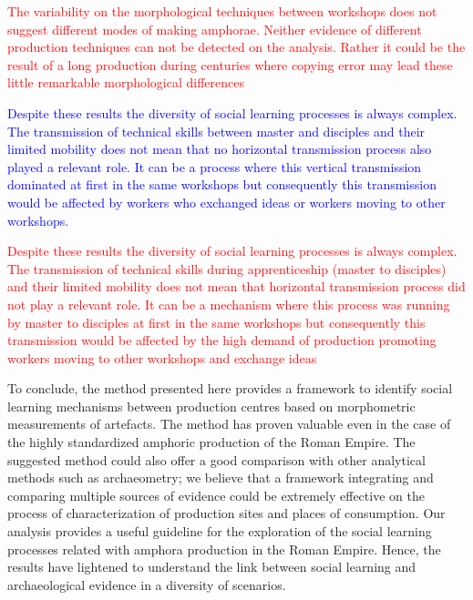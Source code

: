 \documentclass[review]{elsarticle}
\newcommand{\memo}[2]{\textcolor{#1}{#2}}
\newcommand{\maria}[1]{\memo{red}{#1\\}}
\newcommand{\revise}[1]{\memo{blue}{#1\\}}
\begin{document}
\maria{The variability on the morphological techniques between workshops does not suggest different modes of making amphorae. Neither evidence of different production techniques can not be detected on the analysis. Rather it could be the result of a long production during centuries where copying error may lead these little remarkable morphological differences \citep{gandon_copying_2014}}

\revise{Despite these results the diversity of social learning processes is always complex. The transmission of technical skills between master and disciples and their limited mobility does not mean that no horizontal transmission process also played a relevant role. It can be a process where this vertical transmission dominated at first in the same workshops but consequently this transmission would be affected by workers who exchanged ideas or workers moving to other workshops.}

\maria{Despite these results the diversity of social learning processes is always complex. The transmission of technical skills during apprenticeship (master to disciples) and their limited mobility does not mean that horizontal transmission process did not play a relevant role. It can be a mechanism where this process was running by master to disciples at first in the same workshops but consequently this transmission would be affected by the high demand of production promoting workers moving to other workshops and exchange ideas}

To conclude, the method presented here provides a framework to identify social learning mechanisms between production centres based on morphometric measurements of artefacts. The method has proven valuable even in the case of the highly standardized amphoric production of the Roman Empire. The suggested method could also offer a good comparison with other analytical methods such as archaeometry; we believe that a framework integrating and comparing multiple sources of evidence could be extremely effective on the process of characterization of production sites and places of consumption. Our analysis provides a useful guideline for the exploration of the social learning processes related with amphora production in the Roman Empire. Hence, the results have lightened to understand the link between social learning and archaeological evidence in a diversity of scenarios. 
 
\end{document}
